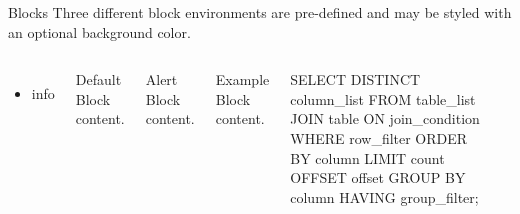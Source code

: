 \begin{frame}[fragile]{Blocks}
  Three different block environments are pre-defined and may be styled with an
  optional background color.

  \begin{columns}[T,onlytextwidth]
      \begin{itemize}
          \item info
      \end{itemize}
      
      \begin{block}{Default}
        Block content.
      \end{block}

      \begin{alertblock}{Alert}
        Block content.
      \end{alertblock}

      \begin{exampleblock}{Example}
        Block content.
      \end{exampleblock}

\begin{sqlcode}
SELECT DISTINCT column_list
FROM table_list
    JOIN table ON join_condition
WHERE row_filter
ORDER BY column
LIMIT count OFFSET offset
GROUP BY column
HAVING group_filter;
\end{sqlcode}


\begin{columns}
\end{columns}
  

  \end{columns}
\end{frame}




